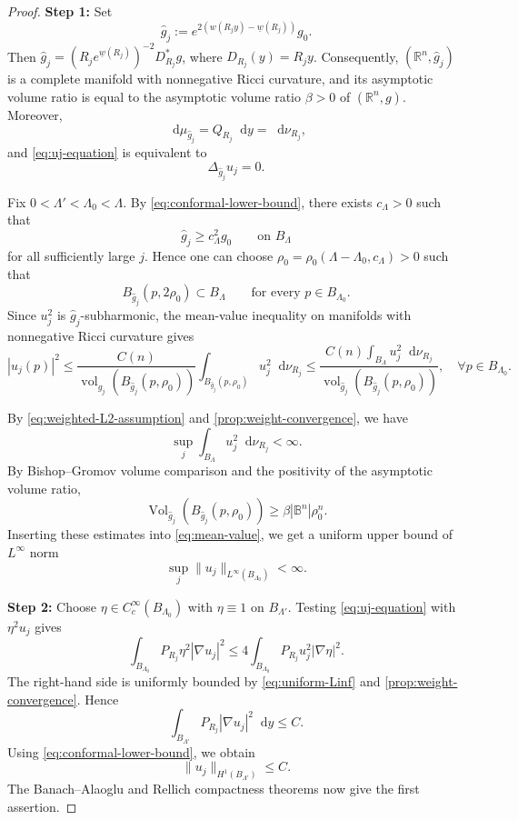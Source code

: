 \documentclass[12pt]{amsart}
\theoremstyle{plain}
\theoremstyle{definition}
\theoremstyle{remark}     %
\numberwithin{equation}{section}
\newcommand{\dd}{\mathop{}\!\mathrm{d}}%
\begin{document}
\begin{proof}
{\bf Step 1: }
Set
\[
    \widehat g_j
    :=e^{2(w(R_jy)-\underline w(R_j))}g_0.
\]
Then $\widehat g_j
    =(R_je^{\underline w(R_j)})^{-2}D_{R_j}^*g$, where $D_{R_j}(y)=R_jy$.
Consequently, $(\mathbb R^n,\widehat g_j)$ is a complete manifold with nonnegative Ricci curvature,
and its asymptotic volume ratio is equal to the asymptotic volume ratio
$\beta>0$ of $(\mathbb R^n,g)$.  Moreover,
\[
    \dd \mu_{\widehat g_j}=Q_{R_j}\dd y=\dd \nu_{R_j},
\]
and \cref{eq:uj-equation} is equivalent to
\[
    \Delta_{\widehat g_j}u_j=0.
\]

Fix $0<\Lambda'<\Lambda_0<\Lambda$.  By
\cref{eq:conformal-lower-bound}, there exists $c_\Lambda>0$ such
that
\[
    \widehat g_j\geq c_\Lambda^2g_0
    \qquad\text{on }B_\Lambda
\]
for all sufficiently large $j$.  Hence one can choose
$\rho_0=\rho_0(\Lambda-\Lambda_0,c_\Lambda)>0$ such that
\[
    B_{\widehat g_j}(p,2\rho_0)\subset B_\Lambda
    \qquad\text{for every }p\in B_{\Lambda_0}.
\]
Since $u_j^2$ is $\widehat g_j$-subharmonic, the mean-value inequality on
manifolds with nonnegative Ricci curvature \cite[Theorem 2.1]{LS} gives
\begin{equation}\label{eq:mean-value}
    |u_j(p)|^2
    \leq
    \frac{C(n)}{
    \operatorname{vol}_{\widehat g_j}
    (B_{\widehat g_j}(p,\rho_0))}
    \int_{B_{\widehat g_j}(p,\rho_0)}u_j^2\dd\nu_{R_j}
    \leq \frac{C(n)\int_{B_\Lambda}
    u_j^2\dd\nu_{R_j}}{
    \operatorname{vol}_{\widehat g_j}
    (B_{\widehat g_j}(p,\rho_0))}
    ,\quad 
    \forall p\in B_{\Lambda_0}.
\end{equation}

 By
\cref{eq:weighted-L2-assumption} and
\cref{prop:weight-convergence}, we have
\[
    \sup_j\int_{B_\Lambda}u_j^2\dd\nu_{R_j}<\infty.
\]
By Bishop--Gromov volume comparison and the positivity of the asymptotic volume ratio,
\[
    \operatorname{Vol}_{\widehat g_j}
    (B_{\widehat g_j}(p,\rho_0))
    \geq\beta|\mathbb{B}^n|\rho_0^n.
\]
Inserting these estimates into \cref{eq:mean-value}, we get a uniform upper bound of $L^\infty$ norm
\begin{equation}\label{eq:uniform-Linf}
    \sup_j\|u_j\|_{L^\infty(B_{\Lambda_0})}<\infty.
\end{equation}

{\bf Step 2:} 
Choose $\eta\in C_c^\infty(B_{\Lambda_0})$ with
$\eta\equiv1$ on $B_{\Lambda'}$.  Testing
\cref{eq:uj-equation} with $\eta^2u_j$ gives
\[
    \int_{B_{\Lambda_0}} P_{R_j}\eta^2|\nabla u_j|^2
    \leq 4\int_{B_{\Lambda_0}}
    P_{R_j}u_j^2|\nabla\eta|^2.
\]
The right-hand side is uniformly bounded by
\cref{eq:uniform-Linf} and
\cref{prop:weight-convergence}.
Hence
\begin{equation}\label{eq:weighted-energy-bound}
    \int_{B_{\Lambda'}}P_{R_j}|\nabla u_j|^2\dd y\leq C.
\end{equation}
Using \cref{eq:conformal-lower-bound}, we obtain
\begin{equation}\label{eq:ordinary-H1-bound}
    \|u_j\|_{H^1(B_{\Lambda'})}\leq C.
\end{equation}
The Banach--Alaoglu and Rellich compactness theorems now give
the first assertion.
\medskip


\end{proof}
\end{document}

